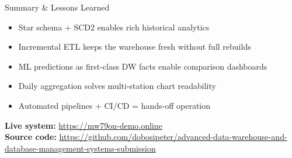 \documentclass[aspectratio=169]{beamer}
\begin{document}
\begin{frame}{Summary \& Lessons Learned}
\begin{itemize}
  \item Star schema + SCD2 enables rich historical analytics
  \item Incremental ETL keeps the warehouse fresh without full rebuilds
  \item ML predictions as first-class DW facts enable comparison dashboards
  \item Daily aggregation solves multi-station chart readability
  \item Automated pipelines + CI/CD = hands-off operation
\end{itemize}
\vspace{1em}
\textbf{Live system:} \url{https://mw79on-demo.online}\\
\textbf{Source code:} \url{https://github.com/dobosipeter/advanced-data-warehouse-and-database-management-systems-submission}
\end{frame}
\end{document}
